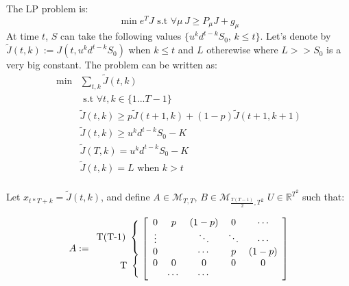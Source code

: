 \documentclass[12pt]{article}
\begin{document}
\begin{enumerate}
  The LP problem is:
  $$\min e^T J \text{ s.t } \forall \mu \, J \ge P_\mu J + g_\mu$$
  At time $t$, $S$ can take the following values $\{ u^k d^{t-k} S_0,\, k \le t\}$. Let's denote by $\tilde J(t, k) := J(t, u^k d^{t-k} S_0)$ when $k \le t$ and $L$ otherewise where $L >> S_0$ is a very big constant.
  The problem can be written as:
  \begin{align*}
    \min &\sum_{t, k} \tilde J(t, k) \\
         &\text{ s.t } \forall t, k \in \{1...T-1\}\\
         & \tilde J(t, k) \ge p \tilde J(t+1, k) + (1-p) \tilde J(t+1, k+1) \\
         & \tilde J(t, k) \ge u^k d^{t-k} S_0 - K\\
         & \tilde J(T, k) = u^k d^{t-k} S_0 - K \\
         & \tilde J(t, k) = L \text{ when } k > t\\
  \end{align*}

  Let $x_{t*T + k} = \tilde J(t, k)$, and define $A \in \mathcal M_{T, T}$,
  $B \in \mathcal M_{\frac{T(T-1)}{2}, T^2}$ $U \in \mathbb R^{T^2}$ such that:

  \[
    A := 
    \begin{array}{r@{}}
      \text{T(T-1)}~\left\{\begin{array}{@{}c@{}}\null\\\null\\\null\end{array}\right.\\
      \text{T}~\left\{\begin{array}{@{}c@{}}\null\\\null\end{array}\right.\\
    \end{array}
  \left [
    \begin{array}{ccccc}
      0               & p                     & (1-p)  & 0     & \cdots \\
      \vdots          &                       & \ddots & \ddots& \cdots \\
      0               &                       & \cdots & p     & (1-p)  \\
      0               & 0                     & 0      & 0     & 0      \\
                      & \cdots                & \cdots &       & 
    \end{array}
  \right ]
\]



\end{enumerate}
\end{document}
